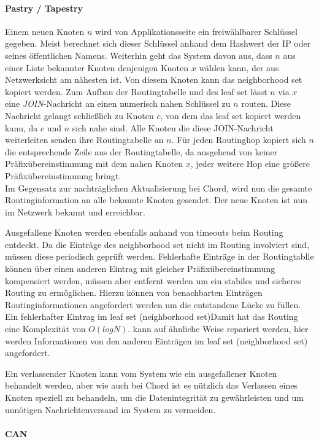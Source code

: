 \paragraph{Pastry / Tapestry}
Einem neuen Knoten $n$ wird von Applikationsseite ein freiwählbarer Schlüssel gegeben. Meist berechnet sich dieser Schlüssel anhand dem Hashwert der IP oder seines öffentlichen Namens. Weiterhin geht das System davon aus, dass $n$ aus einer Liste bekannter Knoten denjenigen Knoten $x$ wählen kann, der aus Netzwerksicht am nähesten ist. Von diesem Knoten kann das neighborhood set kopiert werden. Zum Aufbau der Routingtabelle und des leaf set lässt $n$ via $x$ eine \emph{JOIN}-Nachricht an einen numerisch nahen Schlüssel zu $n$ routen. Diese Nachricht gelangt schließlich zu Knoten $c$, von dem das leaf set kopiert werden kann, da $c$ und $n$ sich nahe sind. Alle Knoten die diese JOIN-Nachricht weiterleiten senden ihre Routingtabelle an $n$. Für jeden Routinghop kopiert sich $n$ die entsprechende Zeile aus der Routingtabelle, da ausgehend von keiner Präfixübereinstimmung mit dem nahen Knoten $x$, jeder weitere Hop eine größere Präfixübereinstimmung bringt.\\
Im Gegensatz zur nachträglichen Aktualisierung bei Chord, wird nun die gesamte Routinginformation an alle bekannte Knoten gesendet. Der neue Knoten ist nun im Netzwerk bekannt und erreichbar.

Ausgefallene Knoten werden ebenfalls anhand von timeouts beim Routing entdeckt. Da die Einträge des neighborhood set nicht im Routing involviert sind, müssen diese periodisch geprüft werden. Fehlerhafte Einträge in der Routingtablle können über einen anderen Eintrag mit gleicher Präfixübereinstimmung kompensiert werden, müssen aber entfernt werden um ein stabiles und sicheres Routing zu ermöglichen. Hierzu können von benachbarten Einträgen Routinginformationen angefordert werden um die entstandene Lücke zu füllen. Ein fehlerhafter Eintrag im leaf set (neighborhood set)Damit hat das Routing eine Komplexität von $O(log N)$. kann auf ähnliche Weise repariert werden, hier werden Informationen von den anderen Einträgen im leaf set  (neighborhood set) angefordert.

Ein verlassender Knoten kann vom System wie ein ausgefallener Knoten behandelt werden, aber wie auch bei Chord ist es nützlich das Verlassen eines Knoten speziell zu behandeln, um die Datenintegrität zu gewährleisten und um unnötigen Nachrichtenversand im System zu vermeiden.

\paragraph{CAN}

